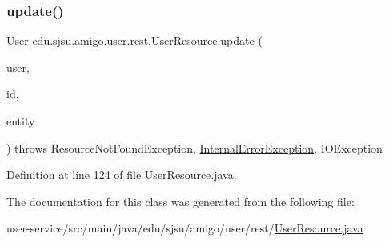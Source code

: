 \subsubsection{\texorpdfstring{update()}{update()}}
{\footnotesize\ttfamily \hyperlink{classedu_1_1sjsu_1_1amigo_1_1user_1_1db_1_1model_1_1_user}{User} edu.\+sjsu.\+amigo.\+user.\+rest.\+User\+Resource.\+update (\begin{DoxyParamCaption}\item[{@Auth \hyperlink{classedu_1_1sjsu_1_1amigo_1_1user_1_1auth_1_1_principal_user}{Principal\+User}}]{user,  }\item[{@Path\+Param(\char`\"{}id\char`\"{}) String}]{id,  }\item[{@Valid String}]{entity }\end{DoxyParamCaption}) throws Resource\+Not\+Found\+Exception, \hyperlink{classedu_1_1sjsu_1_1amigo_1_1user_1_1rest_1_1_internal_error_exception}{Internal\+Error\+Exception}, I\+O\+Exception}



Definition at line 124 of file User\+Resource.\+java.



The documentation for this class was generated from the following file\+:\begin{DoxyCompactItemize}
\item 
user-\/service/src/main/java/edu/sjsu/amigo/user/rest/\hyperlink{_user_resource_8java}{User\+Resource.\+java}\end{DoxyCompactItemize}
